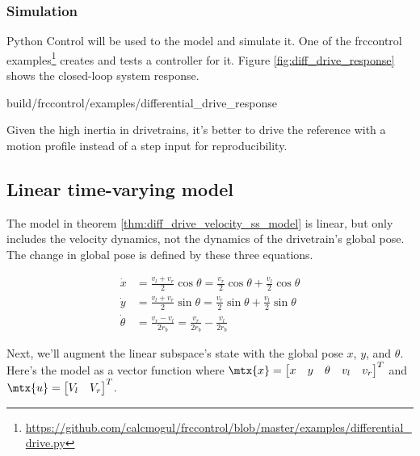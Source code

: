 \subsubsection{Simulation}

Python Control will be used to  the
\gls{model} and simulate it. One of the frccontrol
examples\footnote{\url{https://github.com/calcmogul/frccontrol/blob/master/examples/differential_drive.py}}
creates and tests a controller for it. Figure \ref{fig:diff_drive_response}
shows the closed-loop \gls{system} response.

\begin{svg}{build/frccontrol/examples/differential_drive_response}
  \caption{Drivetrain response}
  \label{fig:diff_drive_response}
\end{svg}

Given the high inertia in drivetrains, it's better to drive the \gls{reference}
with a motion profile instead of a \gls{step input} for reproducibility.

\subsection{Linear time-varying model}

The model in theorem \ref{thm:diff_drive_velocity_ss_model} is linear, but only
includes the velocity dynamics, not the dynamics of the drivetrain's global
pose. The change in global pose is defined by these three equations.

\begin{align*}
  \dot{x} &= \frac{v_l + v_r}{2}\cos\theta = \frac{v_r}{2}\cos\theta +
    \frac{v_l}{2}\cos\theta \\
  \dot{y} &= \frac{v_l + v_r}{2}\sin\theta = \frac{v_r}{2}\sin\theta +
    \frac{v_l}{2}\sin\theta \\
  \dot{\theta} &= \frac{v_r - v_l}{2r_b} = \frac{v_r}{2r_b} - \frac{v_l}{2r_b}
\end{align*}

Next, we'll augment the linear subspace's state with the global pose $x$, $y$,
and $\theta$. Here's the model as a vector function where
$\mtx{x} = \begin{bmatrix} x & y & \theta & v_l & v_r \end{bmatrix}^T$ and
$\mtx{u} = \begin{bmatrix} V_l & V_r \end{bmatrix}^T$.

